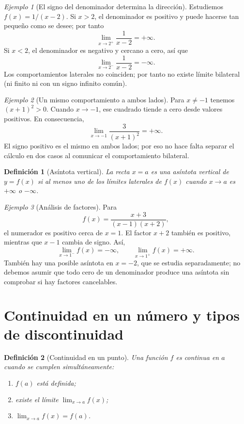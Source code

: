 \documentclass[12pt]{article}
\newtheorem{definicion}{Definición}[section]
\theoremstyle{remark}
\newtheorem{ejemplo}{Ejemplo}
\begin{document}
\begin{ejemplo}[El signo del denominador determina la dirección]
Estudiemos $f(x)=1/(x-2)$. Si $x>2$, el denominador es positivo y puede hacerse tan pequeño como se desee; por tanto
\[
 \boxed{\lim_{x\to2^+}\frac1{x-2}=+\infty.}
\]
Si $x<2$, el denominador es negativo y cercano a cero, así que
\[
 \boxed{\lim_{x\to2^-}\frac1{x-2}=-\infty.}
\]
Los comportamientos laterales no coinciden; por tanto no existe límite bilateral (ni finito ni con un signo infinito común).
\end{ejemplo}

\begin{ejemplo}[Un mismo comportamiento a ambos lados]
Para $x\ne-1$ tenemos $(x+1)^2>0$. Cuando $x\to-1$, ese cuadrado tiende a cero desde valores positivos. En consecuencia,
\[
 \boxed{\lim_{x\to-1}\frac{3}{(x+1)^2}=+\infty.}
\]
El signo positivo es el mismo en ambos lados; por eso no hace falta separar el cálculo en dos casos al comunicar el comportamiento bilateral.
\end{ejemplo}

\begin{definicion}[Asíntota vertical]
La recta $x=a$ es una asíntota vertical de $y=f(x)$ si al menos uno de los límites laterales de $f(x)$ cuando $x\to a$ es $+\infty$ o $-\infty$.
\end{definicion}

\begin{ejemplo}[Análisis de factores]
Para
\[
 f(x)=\frac{x+3}{(x-1)(x+2)},
\]
el numerador es positivo cerca de $x=1$. El factor $x+2$ también es positivo, mientras que $x-1$ cambia de signo. Así,
\[
 \lim_{x\to1^-}f(x)=-\infty,\qquad
 \lim_{x\to1^+}f(x)=+\infty.
\]
También hay una posible asíntota en $x=-2$, que se estudia separadamente; no debemos asumir que todo cero de un denominador produce una asíntota sin comprobar si hay factores cancelables.
\end{ejemplo}



\section{Continuidad en un número y tipos de discontinuidad}
\begin{definicion}[Continuidad en un punto]
Una función $f$ es continua en $a$ cuando se cumplen simultáneamente:
\begin{enumerate}[label=(\roman*),nosep]
 \item $f(a)$ está definida;
 \item existe el límite $\lim_{x\to a}f(x)$;
 \item $\displaystyle\lim_{x\to a}f(x)=f(a)$.
\end{enumerate}
\end{definicion}
\end{document}
